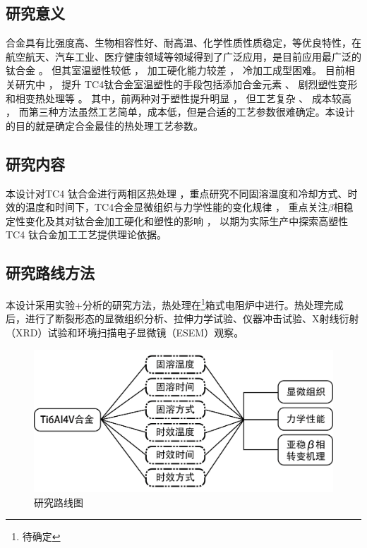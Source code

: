\subsection{研究意义}
\ti 合金具有比强度高、生物相容性好、耐高温、化学性质性质稳定，等优良特性，在航空航天、汽车工业、医疗健康领域等领域得到了广泛应用，是目前应用最广泛的钛合金 。 但其室温塑性较低 ， 加工硬化能力较差 ， 冷加工成型困难。 目前相关研宄中 ， 提升 TC4钛合金室温塑性的手段包括添加合金元素 、 剧烈塑性变形和相变热处理等 。 其中，前两种对于塑性提升明显 ， 但工艺复杂 、 成本较高\cite{miao} ， 而第三种方法虽然工艺简单，成本低，但是合适的工艺参数很难确定。本设计的目的就是确定\ti 合金最佳的热处理工艺参数。
\subsection{研究内容}
本设计对TC4 钛合金进行两相区热处理 ，重点研究不同固溶温度和冷却方式、时效的温度和时间下，TC4合金显微组织与力学性能的变化规律 ， 重点关注$ \beta  $相稳定性变化及其对钛合金加工硬化和塑性的影响 ， 以期为实际生产中探索高塑性 TC4 钛合金加工工艺提供理论依据。
\subsection{研究路线方法}
本设计采用实验+分析的研究方法，热处理在\footnote{待确定}箱式电阻炉中进行。热处理完成后，进行了断裂形态的显微组织分析、拉伸力学试验、仪器冲击试验、X射线衍射（XRD）试验和环境扫描电子显微镜（ESEM）观察。
\begin{figure}[h!]
	\centering
	\includegraphics[width=0.7\linewidth]{pic/路线图}
	\caption{研究路线图}
	\label{fig:roadmap}
\end{figure}
